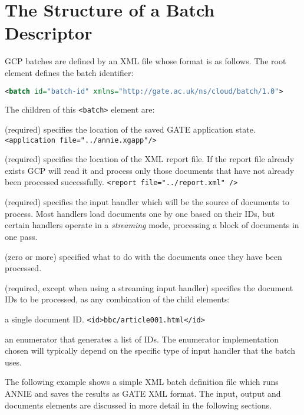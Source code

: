 \section{The Structure of a Batch Descriptor}

GCP batches are defined by an XML file whose format is as follows.  The root
element defines the batch identifier:
\begin{lstlisting}[language=XML]
<batch id="batch-id" xmlns="http://gate.ac.uk/ns/cloud/batch/1.0">
\end{lstlisting}

The children of this \verb!<batch>! element are:
\bde
\item[application] (required) specifies the location of the saved GATE
  application state. \verb!<application file="../annie.xgapp"/>!

\item[report] (required) specifies the location of the XML report file.  If the
  report file already exists GCP will read it and process only those documents
  that have not already been processed successfully.
  \verb!<report file="../report.xml" />!

\item[input] (required) specifies the input handler which will be the source of
  documents to process.  Most handlers load documents one by one based on their
  IDs, but certain handlers operate in a \emph{streaming} mode, processing a
  block of documents in one pass.

\item[output] (zero or more) specified what to do with the documents once they
  have been processed.

\item[documents] (required, except when using a streaming input handler)
  specifies the document IDs to be processed, as any combination of the child
  elements:
  \bde
  \item[id] a single document ID. \verb!<id>bbc/article001.html</id>!
  \item[documentEnumerator] an enumerator that generates a list of IDs.  The
    enumerator implementation chosen will typically depend on the specific type
    of input handler that the batch uses.
  \ede
\ede

The following example shows a simple XML batch definition file which runs ANNIE
and saves the results as GATE XML format.  The input, output and documents
elements are discussed in more detail in the following sections.

